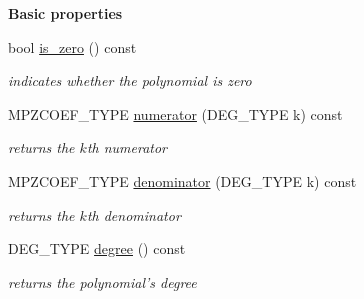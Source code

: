 \begin{Indent}\textbf{ Basic properties}\par
\begin{DoxyCompactItemize}
\item 
\mbox{\label{group__polygroup_a6959dd2fd63384953e774e63c1e2a344}} 
bool \hyperlink{group__polygroup_a6959dd2fd63384953e774e63c1e2a344}{is\+\_\+zero} () const
\begin{DoxyCompactList}\small\item\em indicates whether the polynomial is zero \end{DoxyCompactList}\item 
\mbox{\label{group__polygroup_a2301bb5e91284d51b7c7a49951f8c2d8}} 
M\+P\+Z\+C\+O\+E\+F\+\_\+\+T\+Y\+PE \hyperlink{group__polygroup_a2301bb5e91284d51b7c7a49951f8c2d8}{numerator} (D\+E\+G\+\_\+\+T\+Y\+PE k) const
\begin{DoxyCompactList}\small\item\em returns the $k$th numerator \end{DoxyCompactList}\item 
\mbox{\label{group__polygroup_ab44929e18d513793ff41b2061ea144ee}} 
M\+P\+Z\+C\+O\+E\+F\+\_\+\+T\+Y\+PE \hyperlink{group__polygroup_ab44929e18d513793ff41b2061ea144ee}{denominator} (D\+E\+G\+\_\+\+T\+Y\+PE k) const
\begin{DoxyCompactList}\small\item\em returns the $k$th denominator \end{DoxyCompactList}\item 
\mbox{\label{group__polygroup_a12c3fe334fa0eefdc2533bad00df262d}} 
D\+E\+G\+\_\+\+T\+Y\+PE \hyperlink{group__polygroup_a12c3fe334fa0eefdc2533bad00df262d}{degree} () const
\begin{DoxyCompactList}\small\item\em returns the polynomial's degree \end{DoxyCompactList}\end{DoxyCompactItemize}
\end{Indent}

